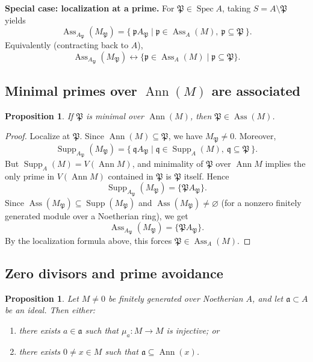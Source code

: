 \documentclass[11pt,a4paper]{article}
\theoremstyle{definition}
\theoremstyle{plain}
\newtheorem{proposition}[definition]{Proposition}
\theoremstyle{remark}
\newcommand{\Ann}{\operatorname{Ann}}
\newcommand{\Spec}{\operatorname{Spec}}
\newcommand{\Supp}{\operatorname{Supp}}
\newcommand{\Ass}{\operatorname{Ass}}
\begin{document}
\noindent\textbf{Special case: localization at a prime.}
For $\mathfrak{P}\in \Spec A$, taking $S=A\setminus \mathfrak{P}$ yields
\[
\Ass_{A_\mathfrak{P}}(M_\mathfrak{P})=\{\ \mathfrak{p}A_\mathfrak{P}\mid \mathfrak{p}\in \Ass_A(M),\ \mathfrak{p}\subseteq \mathfrak{P}\ \}.
\]
Equivalently (contracting back to $A$),
\[
\Ass_{A_\mathfrak{P}}(M_\mathfrak{P}) \leftrightarrow \{\mathfrak{p}\in \Ass_A(M)\mid \mathfrak{p}\subseteq \mathfrak{P}\}.
\]


\subsection*{Minimal primes over $\Ann(M)$ are associated}

\begin{proposition}
If $\mathfrak{P}$ is minimal over $\Ann(M)$, then $\mathfrak{P}\in \Ass(M)$.
\end{proposition}

\begin{proof}
Localize at $\mathfrak{P}$. Since $\Ann(M)\subseteq \mathfrak{P}$, we have $M_\mathfrak{P}\neq 0$.
Moreover,
\[
\Supp_{A_\mathfrak{P}}(M_\mathfrak{P})
=\{\ \mathfrak{q}A_\mathfrak{P}\mid \mathfrak{q}\in \Supp_A(M),\ \mathfrak{q}\subseteq \mathfrak{P}\ \}.
\]
But $\Supp_A(M)=V(\Ann M)$, and minimality of $\mathfrak{P}$ over $\Ann M$ implies the only prime
in $V(\Ann M)$ contained in $\mathfrak{P}$ is $\mathfrak{P}$ itself. Hence
\[
\Supp_{A_\mathfrak{P}}(M_\mathfrak{P})=\{\mathfrak{P}A_\mathfrak{P}\}.
\]
Since $\Ass(M_\mathfrak{P})\subseteq \Supp(M_\mathfrak{P})$ and $\Ass(M_\mathfrak{P})\neq \varnothing$
(for a nonzero finitely generated module over a Noetherian ring), we get
\[
\Ass_{A_\mathfrak{P}}(M_\mathfrak{P})=\{\mathfrak{P}A_\mathfrak{P}\}.
\]
By the localization formula above, this forces $\mathfrak{P}\in \Ass_A(M)$.
\end{proof}


\subsection*{Zero divisors and prime avoidance}

\begin{proposition}
Let $M\neq 0$ be finitely generated over Noetherian $A$, and let $\mathfrak{a}\subset A$ be an ideal.
Then either:
\begin{enumerate}
    \item there exists $a\in \mathfrak{a}$ such that $\mu_a:M\to M$ is injective; or
    \item there exists $0\neq x\in M$ such that $\mathfrak{a}\subseteq \Ann(x)$.
\end{enumerate}
\end{proposition}
\end{document}

